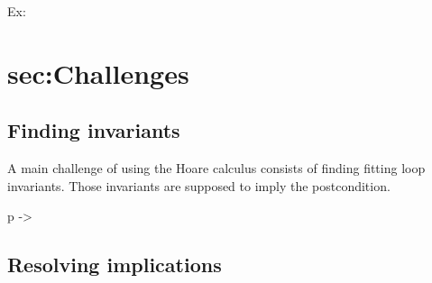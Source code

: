 Ex:

\section{sec:Challenges}\label{sec:challenges}
\subsection{Finding invariants}

A main challenge of using the Hoare calculus consists of finding fitting loop invariants. Those invariants are supposed to imply the postcondition.

p -> 

\subsection{Resolving implications}


%
%
%

